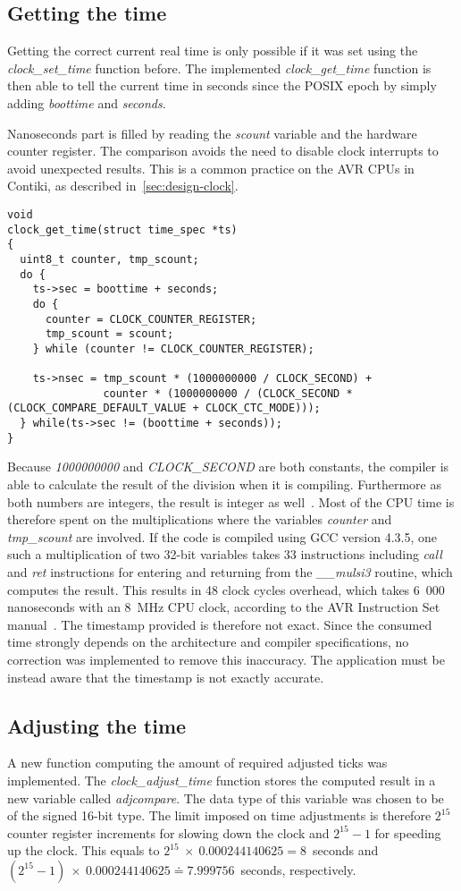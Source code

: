 \subsection{Getting the time}
Getting the correct current real time is only possible if it was set using
the {\it{clock\_set\_time}} function before.
The implemented {\it{clock\_get\_time}} function is then able to tell the
current time in seconds since the POSIX epoch by simply adding {\it{boottime}}
and {\it{seconds}}.

Nanoseconds part is filled by reading the {\it{scount}} variable and the hardware counter register.
The comparison avoids the need to disable clock interrupts to avoid unexpected results.
This is a common practice on the AVR CPUs in Contiki, as described in~\ref{sec:design-clock}.
\begin{lstlisting}
void
clock_get_time(struct time_spec *ts)
{
  uint8_t counter, tmp_scount;
  do {
    ts->sec = boottime + seconds;
    do {
      counter = CLOCK_COUNTER_REGISTER;
      tmp_scount = scount;
    } while (counter != CLOCK_COUNTER_REGISTER);

    ts->nsec = tmp_scount * (1000000000 / CLOCK_SECOND) +
               counter * (1000000000 / (CLOCK_SECOND * (CLOCK_COMPARE_DEFAULT_VALUE + CLOCK_CTC_MODE)));
  } while(ts->sec != (boottime + seconds));
}
\end{lstlisting}
Because {\it{1000000000}} and {\it{CLOCK\_SECOND}} are both constants, the compiler is able to
calculate the result of the division when it is compiling.
Furthermore as both numbers are integers, the result is integer as well~\cite{c99}.
Most of the CPU time is therefore spent on the multiplications where the variables
{\it{counter}} and {\it{tmp\_scount}} are involved. %
If the code is compiled using GCC version 4.3.5,
one such a multiplication of two 32-bit variables takes 33 instructions including {\it{call}} and {\it{ret}}
instructions for entering and returning from the {\it{\_\_mulsi3}} routine, which computes the result.
This results in 48 clock cycles overhead,
which takes 6~000 nanoseconds with an 8~MHz CPU clock, %
according to the AVR Instruction Set manual~\cite{avr-instruction-set}.
The timestamp provided is therefore not exact.
Since the consumed time strongly depends on the architecture and compiler specifications,
no correction was implemented to remove this inaccuracy.
The application must be instead aware that the timestamp is not exactly accurate.

\subsection{Adjusting the time}
A new function computing the amount of required adjusted ticks was implemented.
The {\it{clock\_adjust\_time}} function stores the computed result in
a new variable called {\it{adjcompare}}.
The data type of this variable was chosen to be of the signed 16-bit type.
The limit imposed on time adjustments is therefore $2^{15}$ counter register increments %
for slowing down the clock and $2^{15}-1$ for speeding up the clock.
This equals to $2^{15}~\times~0.000244140625 = 8$~seconds
and $(2^{15} - 1)~\times~0.000244140625 \doteq 7.999756$~seconds, respectively.

